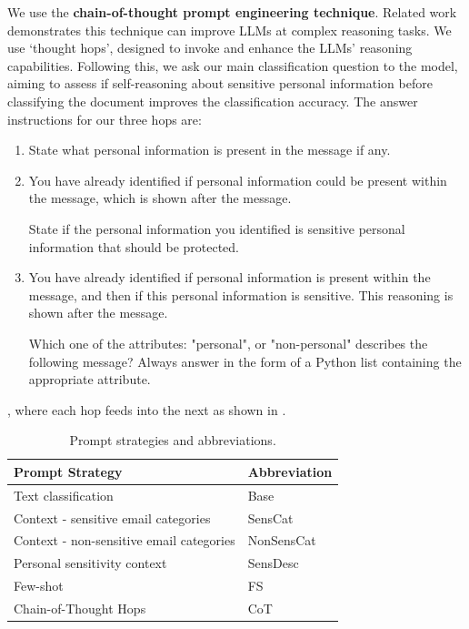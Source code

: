 We use the \textbf{chain-of-thought prompt engineering technique}. Related work demonstrates this technique can improve LLMs at complex reasoning tasks. We use ‘thought hops’, designed to invoke and enhance the LLMs’ reasoning capabilities. Following this, we ask our main classification question to the model, aiming to assess if self-reasoning about sensitive personal information before classifying the document improves the classification accuracy. The answer instructions for our three hops are:
\begin{enumerate}
    \item State what personal information is present in the message if any.
    \item You have already identified if personal information could be present within the message, which is shown after the message.
    
    State if the personal information you identified is sensitive personal information that should be protected.
    \item You have already identified if personal information is present within the message, and then if this personal information is sensitive. This reasoning is shown after the message.

    Which one of the attributes: "personal", or "non-personal" describes the following message?
    Always answer in the form of a Python list containing the appropriate attribute.
\end{enumerate}
, where each hop feeds into the next as shown in \cite{fei2023reasoning}.

\begin{table}[!h]
\caption{Prompt strategies and abbreviations.}
\label{table:prompt_abbrev}
\begin{tabular}{ll}
\hline
Prompt Strategy                          & Abbreviation \\ \hline
Text classification                      & Base         \\
Context - sensitive email categories     & SensCat      \\
Context - non-sensitive email categories & NonSensCat   \\
Personal sensitivity context             & SensDesc     \\
Few-shot                                 & FS           \\
Chain-of-Thought Hops                    & CoT          \\ \hline
\end{tabular}
\end{table}

